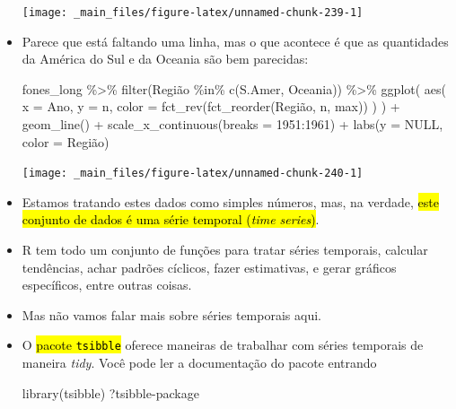 \documentclass[
  11pt]{report}
\newenvironment{Shaded}{\begin{snugshade}}{\end{snugshade}}
\newcommand{\AttributeTok}[1]{\textcolor[rgb]{0.77,0.63,0.00}{#1}}
\newcommand{\ConstantTok}[1]{\textcolor[rgb]{0.00,0.00,0.00}{#1}}
\newcommand{\DecValTok}[1]{\textcolor[rgb]{0.00,0.00,0.81}{#1}}
\newcommand{\FunctionTok}[1]{\textcolor[rgb]{0.00,0.00,0.00}{#1}}
\newcommand{\NormalTok}[1]{#1}
\newcommand{\SpecialCharTok}[1]{\textcolor[rgb]{0.00,0.00,0.00}{#1}}
\newcommand{\StringTok}[1]{\textcolor[rgb]{0.31,0.60,0.02}{#1}}
\renewenvironment{Shaded}{
    \begin{mdframed}[%
      roundcorner=2pt,%
      innerleftmargin=5pt,%
      innerrightmargin=5pt,%
      topline=true,%
      leftline=true,%
      rightline=true,%
      bottomline=true,%
      linewidth=0.5pt,%
      linecolor=black!20,%
      backgroundcolor=black!2,%
      skipabove=2ex,%
      skipbelow=2.5ex%
    ]%
  }
  {
    \end{mdframed}
  }
\begin{document}
\begin{itemize}
  \begin{center}\texttt{[image: \_main\_files/figure-latex/unnamed-chunk-239-1]} \end{center}
\item
  Parece que está faltando uma linha, mas o que acontece é que as quantidades da América do Sul e da Oceania são bem parecidas:

\begin{Shaded}
\begin{Highlighting}[]
\NormalTok{fones\_long }\SpecialCharTok{\%\textgreater{}\%}
  \FunctionTok{filter}\NormalTok{(Região }\SpecialCharTok{\%in\%} \FunctionTok{c}\NormalTok{(}\StringTok{\textquotesingle{}S.Amer\textquotesingle{}}\NormalTok{, }\StringTok{\textquotesingle{}Oceania\textquotesingle{}}\NormalTok{)) }\SpecialCharTok{\%\textgreater{}\%} 
  \FunctionTok{ggplot}\NormalTok{(}
    \FunctionTok{aes}\NormalTok{(}
      \AttributeTok{x =}\NormalTok{ Ano, }
      \AttributeTok{y =}\NormalTok{ n, }
      \AttributeTok{color =} \FunctionTok{fct\_rev}\NormalTok{(}\FunctionTok{fct\_reorder}\NormalTok{(Região, n, max))}
\NormalTok{    )}
\NormalTok{  ) }\SpecialCharTok{+}
    \FunctionTok{geom\_line}\NormalTok{() }\SpecialCharTok{+}
    \FunctionTok{scale\_x\_continuous}\NormalTok{(}\AttributeTok{breaks =} \DecValTok{1951}\SpecialCharTok{:}\DecValTok{1961}\NormalTok{) }\SpecialCharTok{+}
    \FunctionTok{labs}\NormalTok{(}\AttributeTok{y =} \ConstantTok{NULL}\NormalTok{, }\AttributeTok{color =} \StringTok{\textquotesingle{}Região\textquotesingle{}}\NormalTok{)}
\end{Highlighting}
\end{Shaded}

  \begin{center}\texttt{[image: \_main\_files/figure-latex/unnamed-chunk-240-1]} \end{center}
\item
  Estamos tratando estes dados como simples números, mas, na verdade, {\hl{este conjunto de dados é uma série temporal (\emph{time series})}}.
\item
  R tem todo um conjunto de funções para tratar séries temporais, calcular tendências, achar padrões cíclicos, fazer estimativas, e gerar gráficos específicos, entre outras coisas.
\item
  Mas não vamos falar mais sobre séries temporais aqui.
\item
  O {\hl{pacote {\mbox{\texttt{tsibble}}}}} oferece maneiras de trabalhar com séries temporais de maneira \emph{tidy}. Você pode ler a documentação do pacote entrando

\begin{Shaded}
\begin{Highlighting}[]
\FunctionTok{library}\NormalTok{(tsibble)}
\NormalTok{?}\StringTok{\textasciigrave{}}\AttributeTok{tsibble{-}package}\StringTok{\textasciigrave{}}
\end{Highlighting}
\end{Shaded}
\end{itemize}
\end{document}

